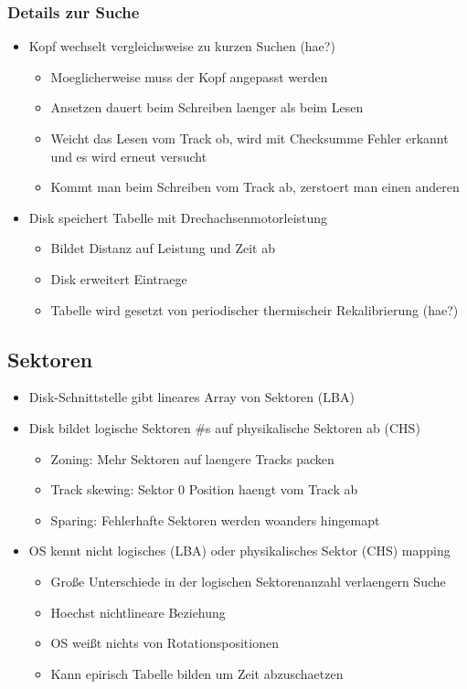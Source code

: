 \documentclass[a4paper]{scrreprt}
\begin{document}
\subsubsection{Details zur Suche}
\begin{itemize}
	\item Kopf wechselt vergleichsweise zu kurzen Suchen (hae?)
		\begin{itemize}
			\item Moeglicherweise muss der Kopf angepasst werden
			\item Ansetzen dauert beim Schreiben laenger als beim Lesen
			\item Weicht das Lesen vom Track ob, wird mit Checksumme Fehler erkannt und es wird erneut versucht
			\item Kommt man beim Schreiben vom Track ab, zerstoert man einen anderen
		\end{itemize}
	\item Disk speichert Tabelle mit Drechachsenmotorleistung
		\begin{itemize}
			\item Bildet Distanz auf Leistung und Zeit ab
			\item Disk erweitert Eintraege
			\item Tabelle wird gesetzt von periodischer thermischeir Rekalibrierung (hae?)
		\end{itemize}
\end{itemize}

\subsection{Sektoren}
\begin{itemize}
	\item Disk-Schnittstelle gibt lineares Array von Sektoren (LBA)
	\item Disk bildet logische Sektoren \#s auf physikalische Sektoren ab (CHS)
		\begin{itemize}
			\item Zoning: Mehr Sektoren auf laengere Tracks packen
			\item Track skewing: Sektor 0 Position haengt vom Track ab
			\item Sparing: Fehlerhafte Sektoren werden woanders hingemapt
		\end{itemize}
	\item OS kennt nicht logisches (LBA) oder physikalisches Sektor (CHS) mapping
		\begin{itemize}
			\item Große Unterschiede in der logischen Sektorenanzahl verlaengern Suche
			\item Hoechst nichtlineare Beziehung
			\item OS weißt nichts von Rotationspositionen
			\item Kann epirisch Tabelle bilden um Zeit abzuschaetzen
		\end{itemize}
\end{itemize}
\end{document}
